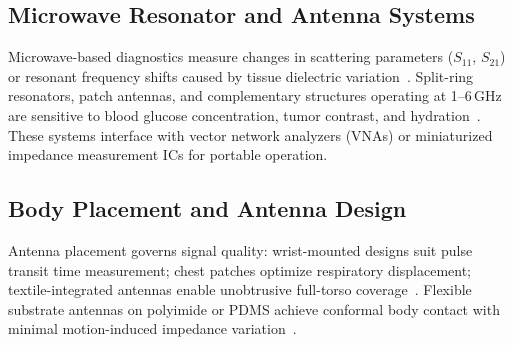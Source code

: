 \documentclass[journal,twoside]{IEEEtran}
\begin{document}
\subsection{Microwave Resonator and Antenna Systems}
Microwave-based diagnostics measure changes in scattering parameters ($S_{11}$, $S_{21}$) or resonant frequency shifts caused by tissue dielectric variation~\cite{ref_noninvasive_glucose2025}. Split-ring resonators, patch antennas, and complementary structures operating at 1--6\,GHz are sensitive to blood glucose concentration, tumor contrast, and hydration~\cite{ref_metamaterial_cancer2024}. These systems interface with vector network analyzers (VNAs) or miniaturized impedance measurement ICs for portable operation.

\subsection{Body Placement and Antenna Design}
Antenna placement governs signal quality: wrist-mounted designs suit pulse transit time measurement; chest patches optimize respiratory displacement; textile-integrated antennas enable unobtrusive full-torso coverage~\cite{ref_iradar2024}. Flexible substrate antennas on polyimide or PDMS achieve conformal body contact with minimal motion-induced impedance variation~\cite{ref_rf_exposure2023}.
\end{document}
